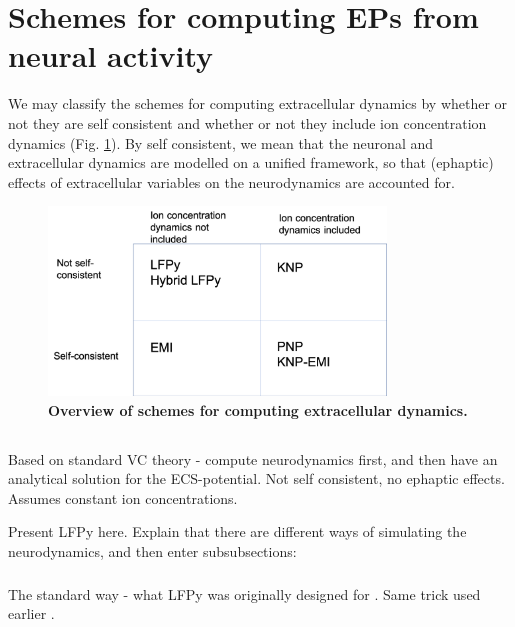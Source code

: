 \section{Schemes for computing EPs from neural activity}
\label{sec:Schemes}

We may classify the schemes for computing extracellular dynamics by whether or not they are self consistent and whether or not they include ion concentration dynamics (Fig. \ref{Schemes:fig:schemes}). By self consistent, we mean that the neuronal and extracellular dynamics are modelled on a unified framework, so that (ephaptic) effects of extracellular variables on the neurodynamics are accounted for. 


\begin{figure}[!ht]
\begin{center}
\includegraphics[width=0.8\textwidth]{Figures/Schemes/schemes.png}
\end{center}
\caption{\textbf{Overview of schemes for computing extracellular dynamics.}}
\label{Schemes:fig:schemes}
\end{figure}

\subsection{}
Based on standard VC theory - compute neurodynamics first, and then have an analytical solution for the ECS-potential.
Not self consistent, no ephaptic effects. Assumes constant ion concentrations.

Present LFPy here. Explain that there are different ways of simulating the neurodynamics, and then enter subsubsections: 

\subsubsection{}
The standard way - what LFPy was originally designed for \cite{Hagen2018}.
Same trick used earlier \citep{Holt1999}.

